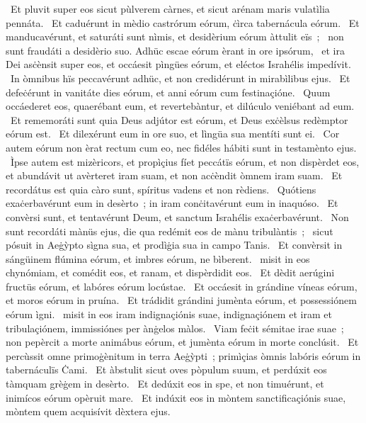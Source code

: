{~Et pluvit super eos sicut pùlverem càrnes, et sicut arénam maris vulatìlia pennáta.
~Et caduérunt in mèdio castrórum eórum, ċìrca tabernácula eórum.
~Et manducavérunt, et saturáti sunt nìmis, et desidèrium eórum àttulit eïs~;
~non sunt fraudáti a desidèrio suo. Adhüc escae eórum èrant in ore ipsórum,
~et ira Dei asċènsit super eos, et occáesit pìngües eórum, et eléctos Israhélis impedívit.
~In òmnibus hïs peccavérunt adhüc, et non credidérunt in mirabìlibus ejus.
~Et defeċérunt in vanitáte dies eórum, et anni eórum cum festinaçióne.
~Quum occáederet eos, quaerébant eum, et revertebàntur, et dilúculo veniébant ad eum.
~Et rememoráti sunt quia Deus adjútor est eórum, et Deus exċèlsus redèmptor eórum est.
~Et dilexérunt eum in ore suo, et lìngüa sua mentíti sunt ei.
~Cor autem eórum non èrat rectum cum eo, nec fidéles hábiti sunt in testamènto ejus.
~Ìpse autem est mizèricors, et propìçius fíet peccátïs eórum, et non dispèrdet eos, et abundávit ut avèrteret iram suam, et non acċèndit òmnem iram suam.
~Et recordátus est quia càro sunt, spíritus vadens et non rèdiens.
~Quótiens exaċerbavérunt eum in desèrto~; in iram conċitavérunt eum in inaquóso.
~Et convèrsi sunt, et tentavérunt Deum, et sanctum Israhélis exaċerbavérunt.
~Non sunt recordáti mànüs ejus, die qua redémit eos de mànu tribulàntis~;
~sicut pósuit in Aeġỳpto sìgna sua, et prodìġia sua in campo Tanis.
~Et convèrsit in sángüinem flúmina eórum, et imbres eórum, ne bìberent.
~misit in eos chynómiam, et comédit eos, et ranam, et dispèrdidit eos.
~Et dèdit aerúgini fructüs eórum, et labóres eórum locústae.
~Et occáesit in grándine víneas eórum, et moros eórum in pruína.
~Et trádidit grándini jumènta eórum, et possessiónem eórum ìgni.
~misit in eos iram indignaçiónis suae, indignaçiónem et iram et tribulaçiónem, immissiónes per ànġelos màlos.
~Viam feċit sémitae irae suae~; non pepèrcit a morte animábus eórum, et jumènta eórum in morte conclúsit.
~Et percùssit omne primoġènitum in terra Aeġỳpti~; primìçias òmnis labóris eórum in tabernáculïs Ċami.
~Et àbstulit sicut oves pòpulum suum, et perdúxit eos tàmquam grèġem in desèrto.
~Et dedúxit eos in spe, et non timuérunt, et inimícos eórum opèruit mare.
~Et indúxit eos in mòntem sanctificaçiónis suae, mòntem quem acquisívit dèxtera ejus.
}
